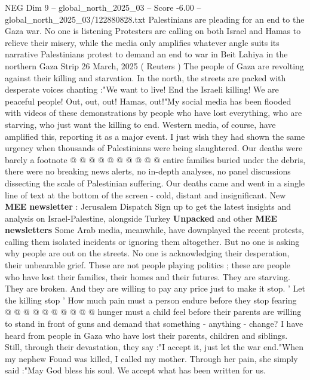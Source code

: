 \begin{textsample}{NEG Dim 9 – global\_north\_2025\_03 – Score -6.00 – global\_north\_2025\_03/122880828.txt}  \label{ex:f9_neg_068}
Palestinians are pleading for an end to the Gaza war.
No one is listening Protesters are calling on both Israel and Hamas to relieve their misery, while the media only amplifies whatever angle suits its narrative Palestinians protest to demand an end to war in Beit Lahiya in the northern Gaza Strip 26 March, 2025 ( Reuters ) The people of Gaza are revolting against their killing and starvation.
In the north, the streets are packed with desperate voices chanting :"We want to live!
End the Israeli killing!
We are peaceful people!
Out, out, out!
Hamas, out!"My social media has been flooded with videos of these demonstrations by people who have lost everything, who are starving, who just want the killing to end.
Western media, of course, have amplified this, reporting it as a major event.
I just wish they had shown the same urgency when thousands of Palestinians were being slaughtered.
Our deaths were barely a footnote @ @ @ @ @ @ @ @ @ @ entire families buried under the debris, there were no breaking news alerts, no in-depth analyses, no panel discussions dissecting the scale of Palestinian suffering.
Our deaths came and went in a single line of text at the bottom of the screen - cold, distant and insignificant.
New \textbf{MEE} \textbf{newsletter} : Jerusalem Dispatch Sign up to get the latest insights and analysis on Israel-Palestine, alongside Turkey \textbf{Unpacked} and other \textbf{MEE} \textbf{newsletters} Some Arab media, meanwhile, have downplayed the recent protests, calling them isolated incidents or ignoring them altogether.
But no one is asking why people are out on the streets.
No one is acknowledging their desperation, their unbearable grief.
These are not people playing politics ; these are people who have lost their families, their homes and their futures.
They are starving.
They are broken.
And they are willing to pay any price just to make it stop. ' Let the killing stop ' How much pain must a person endure before they stop fearing @ @ @ @ @ @ @ @ @ @ hunger must a child feel before their parents are willing to stand in front of guns and demand that something - anything - change?
I have heard from people in Gaza who have lost their parents, children and siblings.
Still, through their devastation, they say :"I accept it, just let the war end."When my nephew Fouad was killed, I called my mother.
Through her pain, she simply said :"May God bless his soul.
We accept what has been written for us.

\end{textsample}
